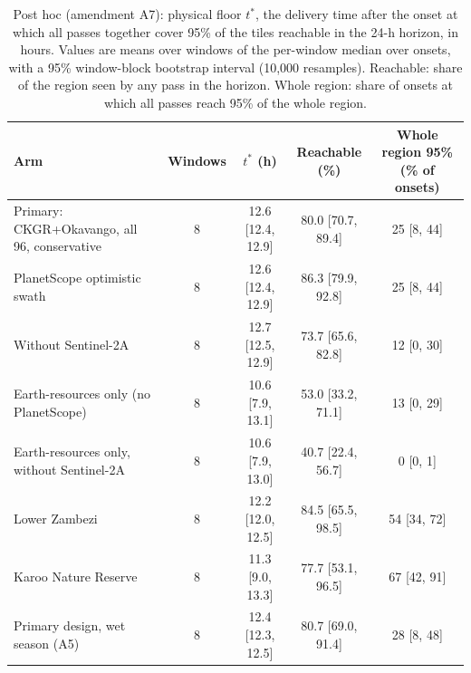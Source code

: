 \begin{table}[!t]
\centering
\footnotesize
\renewcommand{\arraystretch}{1.2}
\setlength{\tabcolsep}{3.5pt}
\caption{Post hoc (amendment A7): physical floor $t^{\ast}$, the delivery time after the onset at which all passes together cover 95\% of the tiles reachable in the 24-h horizon, in hours. Values are means over windows of the per-window median over onsets, with a 95\% window-block bootstrap interval (10,000 resamples). Reachable: share of the region seen by any pass in the horizon. Whole region: share of onsets at which all passes reach 95\% of the whole region.}
\label{tab:a7_floor}
\begin{tabular}{|l|c|c|c|c|}
\hline
Arm & Windows & $t^{\ast}$ (h) & Reachable (\%) & Whole region 95\% (\% of onsets) \\
\hline
Primary: CKGR+Okavango, all 96, conservative & 8 & 12.6 [12.4, 12.9] & 80.0 [70.7, 89.4] & 25 [8, 44] \\
\hline
PlanetScope optimistic swath & 8 & 12.6 [12.4, 12.9] & 86.3 [79.9, 92.8] & 25 [8, 44] \\
\hline
Without Sentinel-2A & 8 & 12.7 [12.5, 12.9] & 73.7 [65.6, 82.8] & 12 [0, 30] \\
\hline
Earth-resources only (no PlanetScope) & 8 & 10.6 [7.9, 13.1] & 53.0 [33.2, 71.1] & 13 [0, 29] \\
\hline
Earth-resources only, without Sentinel-2A & 8 & 10.6 [7.9, 13.0] & 40.7 [22.4, 56.7] & 0 [0, 1] \\
\hline
Lower Zambezi & 8 & 12.2 [12.0, 12.5] & 84.5 [65.5, 98.5] & 54 [34, 72] \\
\hline
Karoo Nature Reserve & 8 & 11.3 [9.0, 13.3] & 77.7 [53.1, 96.5] & 67 [42, 91] \\
\hline
Primary design, wet season (A5) & 8 & 12.4 [12.3, 12.5] & 80.7 [69.0, 91.4] & 28 [8, 48] \\
\hline
\end{tabular}
\end{table}
